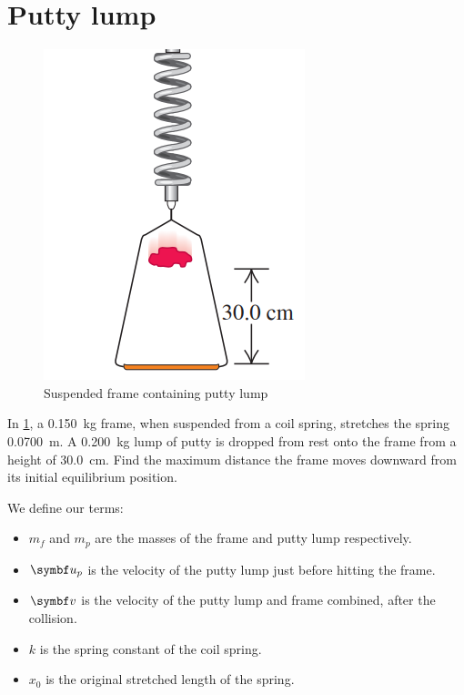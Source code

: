 \section{Putty lump}
\begin{figure}
  \includegraphics[scale=0.5]{assets/puttylump.png}
  \caption{Suspended frame containing putty lump}
  \label{fig:puttylump}
\end{figure}

\begin{problem}
  In \cref{fig:puttylump}, a \qty{0.150}{\kg} frame, when suspended from a coil
  spring, stretches the spring \qty{0.0700}{\metre}. A \qty{0.200}{\kg} lump of
  putty is dropped from rest onto the frame from a height of \qty{30.0}{\cm}.
  Find the maximum distance the frame moves downward from its
  initial equilibrium position.
\end{problem}

We define our terms:
\begin{itemize}
  \item \(m_f\) and \(m_p\) are the masses of the frame and putty
    lump respectively.
  \item \(\mv{u}_p\) is the velocity of the putty lump just before
    hitting the frame.
  \item \(\mv{v}\) is the velocity of the putty lump and frame
    combined, after the collision.
  \item \(k\) is the spring constant of the coil spring.
  \item \(x_0\) is the original stretched length of the spring.
\end{itemize}

